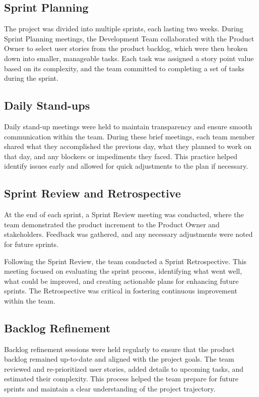 \documentclass[a4paper,12pt,twoside]{ThesisStyle}
\begin{document}
\subsection{Sprint Planning}

The project was divided into multiple sprints, each lasting two weeks. During Sprint Planning meetings, the Development Team collaborated with the Product Owner to select user stories from the product backlog, which were then broken down into smaller, manageable tasks. Each task was assigned a story point value based on its complexity, and the team committed to completing a set of tasks during the sprint.

\subsection{Daily Stand-ups}

Daily stand-up meetings were held to maintain transparency and ensure smooth communication within the team. During these brief meetings, each team member shared what they accomplished the previous day, what they planned to work on that day, and any blockers or impediments they faced. This practice helped identify issues early and allowed for quick adjustments to the plan if necessary.

\subsection{Sprint Review and Retrospective}

At the end of each sprint, a Sprint Review meeting was conducted, where the team demonstrated the product increment to the Product Owner and stakeholders. Feedback was gathered, and any necessary adjustments were noted for future sprints.

Following the Sprint Review, the team conducted a Sprint Retrospective. This meeting focused on evaluating the sprint process, identifying what went well, what could be improved, and creating actionable plans for enhancing future sprints. The Retrospective was critical in fostering continuous improvement within the team.

\subsection{Backlog Refinement}

Backlog refinement sessions were held regularly to ensure that the product backlog remained up-to-date and aligned with the project goals. The team reviewed and re-prioritized user stories, added details to upcoming tasks, and estimated their complexity. This process helped the team prepare for future sprints and maintain a clear understanding of the project trajectory.
\end{document}
